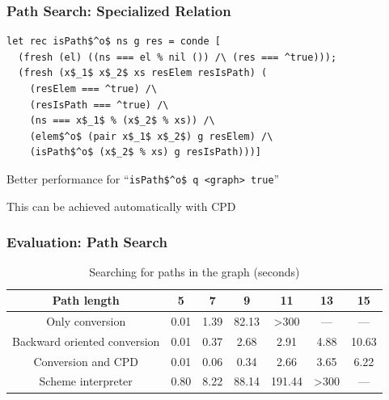 \documentclass[xcolor=table]{beamer}
\begin{document}
\begin{frame}[fragile]
  \transwipe[direction=90]
  \frametitle{Path Search: Specialized Relation}

\begin{lstlisting}[]
let rec isPath$^o$ ns g res = conde [
  (fresh (el) ((ns === el % nil ()) /\ (res === ^true)));
  (fresh (x$_1$ x$_2$ xs resElem resIsPath) (
    (resElem === ^true) /\
    (resIsPath === ^true) /\
    (ns === x$_1$ % (x$_2$ % xs)) /\ 
    (elem$^o$ (pair x$_1$ x$_2$) g resElem) /\
    (isPath$^o$ (x$_2$ % xs) g resIsPath)))]
\end{lstlisting}

Better performance for ``\lstinline{isPath$^o$ q <graph> true}''

\pause 
\vspace{10pt}

This can be achieved automatically with CPD


\end{frame}

\begin{frame}[fragile]
  \transwipe[direction=90]
  \frametitle{Evaluation: Path Search}
  
\begin{table}
\footnotesize
\centering
\begin{tabular}{c|c|c|c|c|c|c}
Path length                   & 5      & 7     & 9      & 11      & 13     & 15        \\
\hline\hline
Only conversion               & 0.01  & 1.39 &  82.13 & >300     & ---      & ---     \\
\hline
Backward oriented conversion  & 0.01 & 0.37 &  2.68 & 2.91   & 4.88    & 10.63   \\
\hline
Conversion and CPD            & 0.01  & 0.06 &  0.34 & 2.66   & 3.65    & 6.22  \\
\hline
Scheme interpreter            & 0.80  & 8.22 & 88.14 & 191.44 & >300   & ---   \\
\end{tabular}

 \caption{Searching for paths in the graph (seconds)}
    \label{tab:isPath}
\end{table}
\end{frame}
\end{document}
